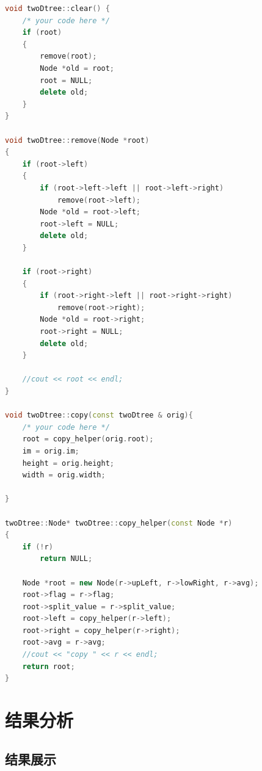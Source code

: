 \documentclass[UTF8]{ctexart}
\begin{document}
\begin{lstlisting}[language=C++,caption={twoDTree.cpp},label={twoDTree.cpp}]
void twoDtree::clear() {
	/* your code here */
    if (root)
    {
        remove(root);
        Node *old = root;
        root = NULL;
        delete old;
    }
}

void twoDtree::remove(Node *root)
{
    if (root->left)
    {
        if (root->left->left || root->left->right)
            remove(root->left);
        Node *old = root->left;
        root->left = NULL;
        delete old;
    }
    
    if (root->right)
    {
        if (root->right->left || root->right->right)
            remove(root->right);
        Node *old = root->right;
        root->right = NULL;
        delete old;
    }

    //cout << root << endl;
}

void twoDtree::copy(const twoDtree & orig){
	/* your code here */
    root = copy_helper(orig.root);
    im = orig.im;
    height = orig.height;
    width = orig.width;

}

twoDtree::Node* twoDtree::copy_helper(const Node *r)
{
    if (!r)
        return NULL;
    
    Node *root = new Node(r->upLeft, r->lowRight, r->avg);
    root->flag = r->flag;
    root->split_value = r->split_value;
    root->left = copy_helper(r->left);
    root->right = copy_helper(r->right);
    root->avg = r->avg;
    //cout << "copy " << r << endl;
    return root;
}

\end{lstlisting}
	\section{结果分析}
	\subsection{结果展示}
\end{document}
